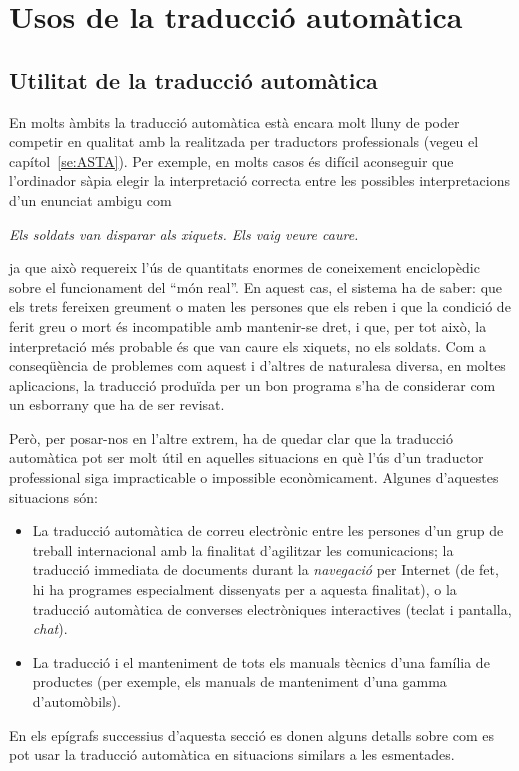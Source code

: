 \chapter{Usos de la traducció automàtica}
\label{se:UTA}

\section{Utilitat de la traducció automàtica}
\label{ss:UTA}
En molts àmbits la traducció automàtica està encara molt
lluny de poder competir en qualitat amb la realitzada per traductors
professionals (vegeu el capítol~\ref{se:ASTA}). 
Per exemple, en molts casos és difícil aconseguir que l'ordinador
sàpia elegir la interpretació correcta  entre les possibles
interpretacions 
d'un enunciat ambigu com 
\begin{center}
\emph{Els soldats van disparar als xiquets. Els vaig veure caure.}
\end{center} 
ja que això requereix l'ús de quantitats enormes de coneixement
enciclopèdic sobre el funcionament del ``món real''. En aquest cas, el
sistema ha de saber: que els trets fereixen greument o maten les
persones que els reben i que la condició de ferit greu o mort és
incompatible amb mantenir-se dret, i que, per tot això, la
interpretació més probable és que van caure els xiquets, no els
soldats. Com a conseqüència de problemes com aquest i d'altres de
naturalesa diversa, en moltes aplicacions, la traducció produïda per
un bon programa s'ha de considerar com un esborrany que ha de ser
revisat.


Però, per posar-nos en l'altre extrem, 
ha de quedar clar que la traducció
automàtica pot ser molt útil en aquelles situacions en què
l'ús d'un traductor professional siga impracticable o impossible
econòmicament. Algunes d'aquestes situacions són:
\begin{itemize}
\item La traducció automàtica de correu electrònic entre les persones
d'un grup de treball internacional amb la finalitat d'agilitzar les
comunicacions; la traducció immediata de documents durant la
\emph{navegació} per Internet (de fet, hi ha programes especialment
dissenyats per a aquesta finalitat), o 
la traducció automàtica de converses electròniques interactives
(teclat i pantalla, \emph{chat}).
\item La traducció i el manteniment de tots els manuals tècnics
d'una família de productes (per exemple, els manuals de manteniment
d'una gamma d'automòbils).
\end{itemize}
En els epígrafs successius d'aquesta secció es donen alguns detalls sobre
com es pot usar la traducció automàtica en situacions
similars a les esmentades.


